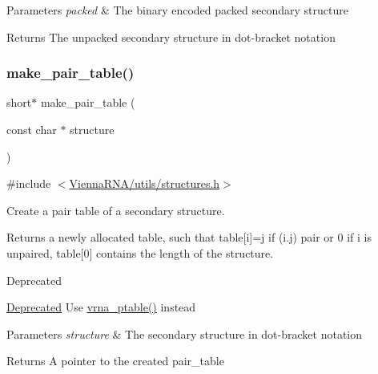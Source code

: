 \begin{DoxyParams}{Parameters}
{\em packed} & The binary encoded packed secondary structure \\
\hline
\end{DoxyParams}
\begin{DoxyReturn}{Returns}
The unpacked secondary structure in dot-\/bracket notation 
\end{DoxyReturn}
\mbox{\label{group__struct__utils__deprecated_ga89c32307ee50a0026f4a3131fac0845a}} 
\subsubsection{\texorpdfstring{make\+\_\+pair\+\_\+table()}{make\_pair\_table()}}
{\footnotesize\ttfamily short$\ast$ make\+\_\+pair\+\_\+table (\begin{DoxyParamCaption}\item[{const char $\ast$}]{structure }\end{DoxyParamCaption})}



{\ttfamily \#include $<$\hyperlink{utils_2structures_8h}{Vienna\+R\+N\+A/utils/structures.\+h}$>$}



Create a pair table of a secondary structure. 

Returns a newly allocated table, such that table\mbox{[}i\mbox{]}=j if (i.\+j) pair or 0 if i is unpaired, table\mbox{[}0\mbox{]} contains the length of the structure.

\begin{DoxyRefDesc}{Deprecated}
\item[\hyperlink{deprecated__deprecated000185}{Deprecated}]Use \hyperlink{group__struct__utils__pair__table_gae829fb8bb7f694c12a9c0bbc34c77c60}{vrna\+\_\+ptable()} instead\end{DoxyRefDesc}

\begin{DoxyParams}{Parameters}
{\em structure} & The secondary structure in dot-\/bracket notation \\
\hline
\end{DoxyParams}
\begin{DoxyReturn}{Returns}
A pointer to the created pair\+\_\+table 
\end{DoxyReturn}
\mbox{\label{group__struct__utils__deprecated_gafeaa6d68eef3a99d0a7aa08aa91c6601}} 
